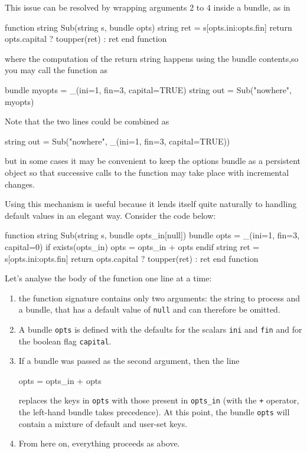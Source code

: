This issue can be resolved by wrapping arguments 2 to 4 inside a
bundle, as in
\begin{code}
function string Sub(string s, bundle opts)
    string ret = s[opts.ini:opts.fin]
    return opts.capital ? toupper(ret) : ret
end function
\end{code}
where the computation of the return string happens using the bundle
contents,so you may call the function as
\begin{code}
  bundle myopts = _(ini=1, fin=3, capital=TRUE)
  string out = Sub("nowhere", myopts)
\end{code}
Note that the two lines could be combined as
\begin{code}
  string out = Sub("nowhere", _(ini=1, fin=3, capital=TRUE))
\end{code}
but in some cases it may be convenient to keep the options bundle as a
persistent object so that successive calls to the function may take
place with incremental changes.

Using this mechanism is useful because it lends itself quite naturally
to handling default values in an elegant way. Consider the code below:
\begin{code}
function string Sub(string s, bundle opts_in[null])
    bundle opts = _(ini=1, fin=3, capital=0)
    if exists(opts_in)
        opts = opts_in + opts
    endif
    string ret = s[opts.ini:opts.fin]
    return opts.capital ? toupper(ret) : ret
end function
\end{code}
Let's analyse the body of the function one line at a time:
\begin{enumerate}
\item the function signature contains only two arguments: the string
  to process and a bundle, that has a default value of \texttt{null}
  and can therefore be omitted.
\item A bundle \texttt{opts} is defined with the defaults for the
  scalars \texttt{ini} and \texttt{fin} and for the boolean flag
  \texttt{capital}.
\item If a bundle was passed as the second argument, then the line
  \begin{code}
     opts = opts_in + opts
  \end{code}
  replaces the keys in \texttt{opts} with those present in
  \texttt{opts\_in} (with the \texttt{+} operator, the left-hand
  bundle takes precedence). At this point, the bundle \texttt{opts}
  will contain a mixture of default and user-set keys.
\item From here on, everything proceeds as above.
\end{enumerate}

